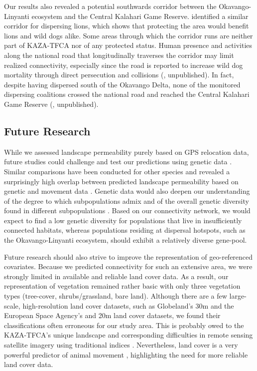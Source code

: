 \documentclass[abstract=on,10pt,a4paper,bibliography=totocnumbered]{scrartcl}
\begin{document}
Our results also revealed a potential southwards corridor between the
Okavango-Linyanti ecosystem and the Central Kalahari Game Reserve.
\cite{Elliot.2014} identified a similar corridor for dispersing lions, which
shows that protecting the area would benefit lions and wild dogs alike. Some
areas through which the corridor runs are neither part of KAZA-TFCA nor of any
protected status. Human presence and activities along the national road that
longitudinally traverses the corridor may limit realized connectivity,
especially since the road is reported to increase wild dog mortality through
direct persecution and collisions (\citeauthor{Cozzi.2020}, unpublished). In
fact, despite having dispersed south of the Okavango Delta, none of the
monitored dispersing coalitions crossed the national road and reached the
Central Kalahari Game Reserve (\citeauthor{Cozzi.2020}, unpublished).

\subsection{Future Research}
While we assessed landscape permeability purely based on GPS relocation
data, future studies could challenge and test our predictions using genetic data
\citep{Spear.2010}. Similar comparisons have been conducted for other species
and revealed a surprisingly high overlap between predicted landscape
permeability based on genetic and movement data \citep{Cushman.2010}. Genetic
data would also deepen our understanding of the degree to which subpopulations
admix and of the overall genetic diversity found in different subpopulations
\citep{Girman.2001}. Based on our connectivity network, we would expect to find
a low genetic diversity for populations that live in insufficiently connected
habitats, whereas populations residing at dispersal hotspots, such as the
Okavango-Linyanti ecosystem, should exhibit a relatively diverse gene-pool.

Future research should also strive to improve the representation of
geo-referenced covariates. Because we predicted connectivity for such an
extensive area, we were strongly limited in available and reliable land cover
data. As a result, our representation of vegetation remained rather basic with
only three vegetation types (tree-cover, shrubs/grassland, bare land). Although
there are a few large-scale, high-resolution land cover datasets, such as
Globeland's 30m \citep{Chen.2015} and the European Space Agency's and 20m
\citep{ESA.2019} land cover datasets, we found their classifications often
erroneous for our study area. This is probably owed to the KAZA-TFCA's unique
landscape and corresponding difficulties in remote sensing satellite imagery
using traditional indices \citep{Wolski.2017}. Nevertheless, land cover is a
very powerful predictor of animal movement \citep{Thurfjell.2014}, highlighting
the need for more reliable land cover data.
\end{document}

